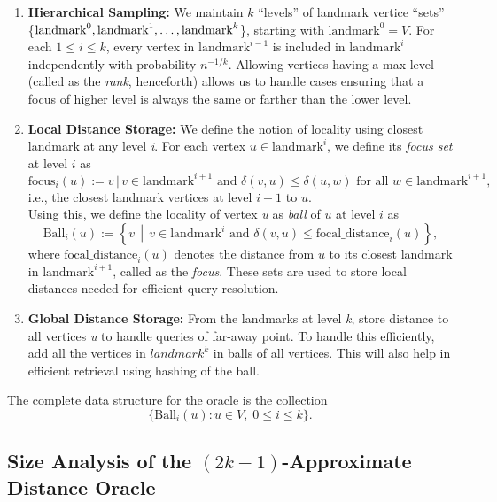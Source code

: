 \documentclass{article}
\begin{document}
\begin{enumerate}
    \item \textbf{Hierarchical Sampling:} We maintain \( k \) ``levels'' of landmark vertice ``sets'' \{\( \text{landmark}^0, \\ \text{landmark}^1, \ldots, \text{landmark}^k \)\}, starting with \( \text{landmark}^0 = V \). For each \( 1 \le i \le k \), every vertex in \( \text{landmark}^{i-1} \) is included in \( \text{landmark}^i \) independently with probability \( n^{-1/k} \). Allowing vertices having a max level (called as the \emph{rank}, henceforth) allows us to handle cases ensuring that a focus of higher level is always the same or farther than the lower level.

    \item \textbf{Local Distance Storage:} We define the notion of locality using closest landmark at any level \textit{i}. For each vertex \( u \in \text{landmark}^i \), we define its \emph{focus set} at level \( i \) as
    \[
    \text{focus}_i(u) :=  v \,|\, v \in \text{landmark}^{i+1} \text{ and } \delta(v, u) \le \delta(u, w) \text{ for all } w \in \text{landmark}^{i+1} ,
    \]
    i.e., the closest landmark vertices at level \( i+1 \) to \( u \).\\
    Using this, we define the locality of vertex \textit{u} as \emph{ball} of \( u \) at level \( i \) as
    \[
    \text{Ball}_i(u) := \left\{ v \,\middle|\, v \in \text{landmark}^i \text{ and } \delta(v, u) \le \text{focal\_distance}_i(u) \right\},
    \]
    where \( \text{focal\_distance}_i(u) \) denotes the distance from \( u \) to its closest landmark in \( \text{landmark}^{i+1} \), called as the \emph{focus}. These sets are used to store local distances needed for efficient query resolution.

    \item \textbf{Global Distance Storage:} From the landmarks at level \textit{k}, store distance to 
    all vertices \textit{u} to handle queries of far-away point. To handle this efficiently, add all the vertices in \(landmark^k\) in balls of all vertices. This will also help in efficient retrieval using hashing of the ball. 
\end{enumerate}

The complete data structure for the oracle is the collection
\[
\{\text{Ball}_i(u) : u \in V,\; 0 \le i \le k\}.
\]

\subsection{Size Analysis of the \((2k-1)\)-Approximate Distance Oracle}
\end{document}
